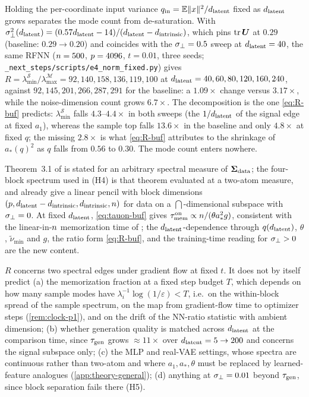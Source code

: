 \begin{remark}\label{rem:normfixed-buf}
Holding the per-coordinate input variance $q_{\rm in}=\mathbb{E}\|x\|^2/d_{\mathrm{latent}}$ fixed as $d_{\mathrm{latent}}$ grows separates the mode count from de-saturation. With $\sigma_{\perp}^2(d_{\mathrm{latent}})=(0.57d_{\mathrm{latent}}-14)/(d_{\mathrm{latent}}-d_{\mathrm{intrinsic}})$, which pins $\operatorname{tr}\bm{U}$ at $0.29$ (baseline: $0.29\to0.20$) and coincides with the $\sigma_{\perp}=0.5$ sweep at $d_{\mathrm{latent}}=40$, the same RFNN ($n=500$, $p=4096$, $t=0.01$, three seeds; \texttt{\_next\_steps/scripts/e4\_norm\_fixed.py}) gives $R=\lambda^{\mathcal S}_{\min}/\lambda^{\mathcal M}_{\max}=92,140,158,136,119,100$ at $d_{\mathrm{latent}}=40,60,80,120,160,240$, against $92,145,201,266,287,291$ for the baseline: a $1.09\times$ change versus $3.17\times$, while the noise-dimension count grows $6.7\times$. The decomposition is the one \eqref{eq:R-buf} predicts: $\lambda^{\mathcal S}_{\min}$ falls $4.3$--$4.4\times$ in both sweeps (the $1/d_{\mathrm{latent}}$ of the signal edge at fixed $a_1$), whereas the sample top falls $13.6\times$ in the baseline and only $4.8\times$ at fixed $q$; the missing $2.8\times$ is what \eqref{eq:R-buf} attributes to the shrinkage of $a_*(q)^2$ as $q$ falls from $0.56$ to $0.30$. The mode count enters nowhere.
\end{remark}


\begin{remark}\label{rem:prior-buf}
Theorem~3.1 of \citet{bonnaire2025} is stated for an arbitrary spectral measure of $\bm{\Sigma}_{\mathrm{data}}$; the four-block spectrum used in (H4) is that theorem evaluated at a two-atom measure, and \citet{george2025dsm} already give a linear pencil with block dimensions $(p,d_{\mathrm{latent}}-d_{\mathrm{intrinsic}},d_{\mathrm{intrinsic}},n)$ for data on a $\dint$-dimensional subspace with $\sigma_{\perp}=0$. At fixed $d_{\mathrm{latent}}$, \eqref{eq:tauon-buf} gives $\tau_{\mathrm{mem}}^{\rm on}\propto n/(\theta a_*^2g)$, consistent with the linear-in-$n$ memorization time of \citet{bonnaire2025}; the $d_{\mathrm{latent}}$-dependence through $q(d_{\mathrm{latent}})$, $\theta$, $\tilde\nu_{\min}$ and $g$, the ratio form \eqref{eq:R-buf}, and the training-time reading for $\sigma_{\perp}>0$ are the new content.
\end{remark}

\begin{remark}\label{rem:notpredicted-buf}
$R$ concerns two spectral edges under gradient flow at fixed $t$. It does not by itself predict (a) the memorization fraction at a fixed step budget $T$, which depends on how many sample modes have $\lambda_i^{-1}\log(1/\varepsilon)<T$, i.e.\ on the within-block spread of the sample spectrum, on the map from gradient-flow time to optimizer steps (\cref{rem:clock-p1}), and on the drift of the NN-ratio statistic with ambient dimension; (b) whether generation quality is matched across $d_{\mathrm{latent}}$ at the comparison time, since $\tau_{\mathrm{gen}}$ grows $\approx11\times$ over $d_{\mathrm{latent}}=5\to200$ and concerns the signal subspace only; (c) the MLP and real-VAE settings, whose spectra are continuous rather than two-atom and where $a_1,a_*,\theta$ must be replaced by learned-feature analogues (\cref{app:theory-general}); (d) anything at $\sigma_{\perp}=0.01$ beyond $\tau_{\mathrm{gen}}$, since block separation fails there (H5).
\end{remark}

